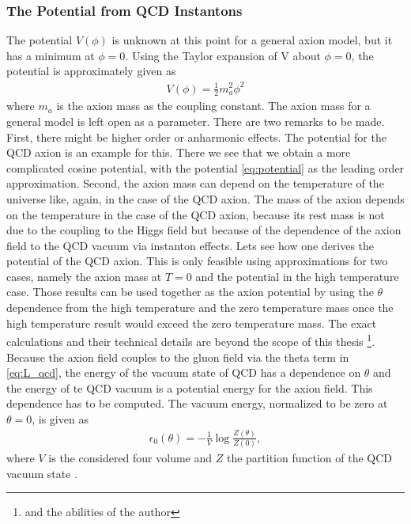\documentclass[twoside,a4paper, 12pt]{article}
\numberwithin{equation}{section}
\begin{document}
\subsubsection{The Potential from QCD Instantons}
\label{sec:axion_mass}
\label{sec:DIGA}

The potential $V(\phi)$ is unknown at this point for a general axion model, but it has a minimum
at $\phi = 0$. Using the Taylor expansion of V about $\phi = 0$, the potential is approximately given as
\begin{align}
    \label{eq:potential}
    V(\phi) = \frac{1}{2} m_a^2 \phi^2
\end{align}
where $m_a$ is the axion mass as the coupling constant.
The axion mass for a general model is left open as a parameter.
There are two remarks to be made.
First, there might be higher order or anharmonic effects.
The potential for the QCD axion is an example for this. There we see that we obtain a
more complicated cosine potential, with the potential \eqref{eq:potential} as the
leading order approximation.
Second, the axion mass can depend on the temperature of the universe like, again, in the case of the QCD axion.
The mass of the axion depends on the temperature in the case of the QCD axion, because its rest mass is not due
to the coupling to the Higgs field but because of the dependence of the axion field to the QCD vacuum via instanton effects.
Lets see how one derives the potential of the QCD axion.
This is only feasible using approximations for two cases, namely the axion mass at $T = 0$ and the potential in the high temperature case. 
Those results can be used together as the axion potential by using the
$\theta$ dependence from the high temperature and the zero temperature
mass once the high temperature result would exceed the zero temperature mass.
The exact calculations and their technical details are beyond the scope of this thesis \footnote{and the abilities of the author}.
Because the axion field couples to the gluon field via the theta term in \eqref{eq:L_qcd},
the energy of the vacuum state of QCD has a dependence on $\theta$ and the energy of te QCD vacuum
is a potential energy for the axion field. This dependence has to be computed.
The vacuum energy, normalized to be zero at $\theta = 0$, is given as
\begin{align*}
   \epsilon_0(\theta) = - \frac{1}{V} \log \frac{Z(\theta)}{Z(0)},
\end{align*}
where $V$ is the considered four volume and $Z$ the partition function of the QCD vacuum state
\cite[Eq. 2.2]{FiniteTempQCD}.
\end{document}
